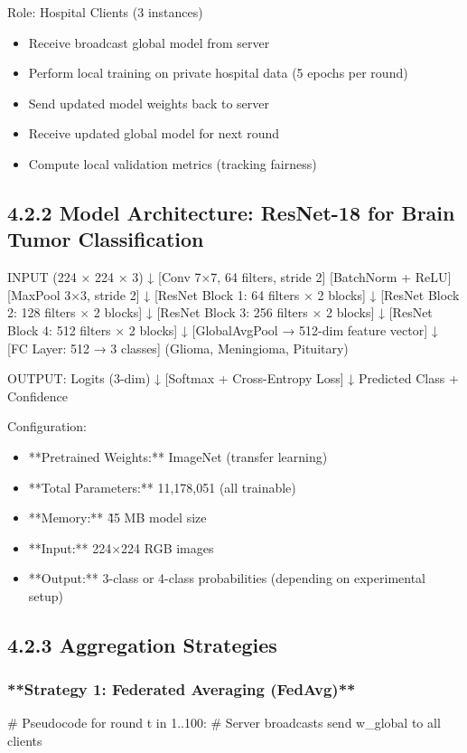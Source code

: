 Role: Hospital Clients (3 instances)

\begin{itemize}
  \item Receive broadcast global model from server
  \item Perform local training on private hospital data (5 epochs per round)
  \item Send updated model weights back to server
  \item Receive updated global model for next round
  \item Compute local validation metrics (tracking fairness)
\end{itemize}


\subsection{4.2.2 Model Architecture: ResNet-18 for Brain Tumor Classification}
INPUT (224 × 224 × 3)
  ↓
[Conv 7×7, 64 filters, stride 2]
[BatchNorm + ReLU]
[MaxPool 3×3, stride 2]
  ↓
[ResNet Block 1: 64 filters × 2 blocks]
  ↓
[ResNet Block 2: 128 filters × 2 blocks]
  ↓
[ResNet Block 3: 256 filters × 2 blocks]
  ↓
[ResNet Block 4: 512 filters × 2 blocks]
  ↓
[GlobalAvgPool → 512-dim feature vector]
  ↓
[FC Layer: 512 → 3 classes]
  (Glioma, Meningioma, Pituitary)
  
OUTPUT: Logits (3-dim)
  ↓
[Softmax + Cross-Entropy Loss]
  ↓
Predicted Class + Confidence

Configuration:

\begin{itemize}
  \item **Pretrained Weights:** ImageNet (transfer learning)
  \item **Total Parameters:** 11,178,051 (all trainable)
  \item **Memory:** \~45 MB model size
  \item **Input:** 224×224 RGB images
  \item **Output:** 3-class or 4-class probabilities (depending on experimental setup)
\end{itemize}


\subsection{4.2.3 Aggregation Strategies}

\subsubsection{**Strategy 1: Federated Averaging (FedAvg)**}
\# Pseudocode
for round t in 1..100:
    \# Server broadcasts
    send w\_global to all clients
    
